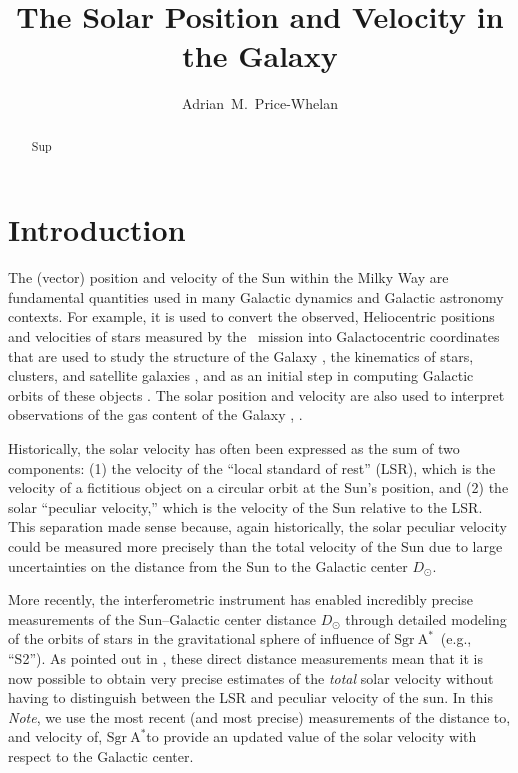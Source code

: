 \documentclass[RNAAS]{aastex631}
\newcommand{\sgrA}{\ensuremath{\textrm{Sgr}~\textrm{A}^{*}}}
\begin{document}
\title{The Solar Position and Velocity in the Galaxy}

\author[0000-0003-0872-7098]{Adrian~M.~Price-Whelan}



\begin{abstract}\noindent
Sup
\end{abstract}

\section{Introduction} \label{sec:intro}

The (vector) position and velocity of the Sun within the Milky Way are
fundamental quantities used in many Galactic dynamics and Galactic astronomy
contexts.
For example, it is used to convert the observed, Heliocentric positions and
velocities of stars measured by the \gaia\ mission into Galactocentric
coordinates that are used to study the structure of the Galaxy
\cite[e.g.,][]{todo}, the kinematics of stars, clusters, and satellite galaxies
\cite[e.g.,][]{todo}, and as an initial step in computing Galactic orbits of
these objects \citep[e.g.,][]{}.
The solar position and velocity are also used to interpret observations of the
gas content of the Galaxy \citep{todo}, .

Historically, the solar velocity has often been expressed as the sum of two
components: (1) the velocity of the ``local standard of rest'' (LSR), which is
the velocity of a fictitious object on a circular orbit at the Sun's position,
and (2) the solar ``peculiar velocity,'' which is the velocity of the Sun
relative to the LSR.
This separation made sense because, again historically, the solar peculiar
velocity could be measured more precisely than the total velocity of the Sun due
to large uncertainties on the distance from the Sun to the Galactic center
$D_\odot$.

More recently, the interferometric  instrument has enabled
incredibly precise measurements of the Sun--Galactic center distance $D_\odot$
through detailed modeling of the orbits of stars in the gravitational sphere of
influence of \sgrA\ (e.g., ``S2'').
As pointed out in \citet{Drimmel:2018}, these direct distance measurements mean
that it is now possible to obtain very precise estimates of the \emph{total}
solar velocity without having to distinguish between the LSR and peculiar
velocity of the sun.
In this \textit{Note}, we use the most recent (and most precise)
 measurements of the distance to, and velocity of, \sgrA to
provide an updated value of the solar velocity with respect to the Galactic
center.
\end{document}
